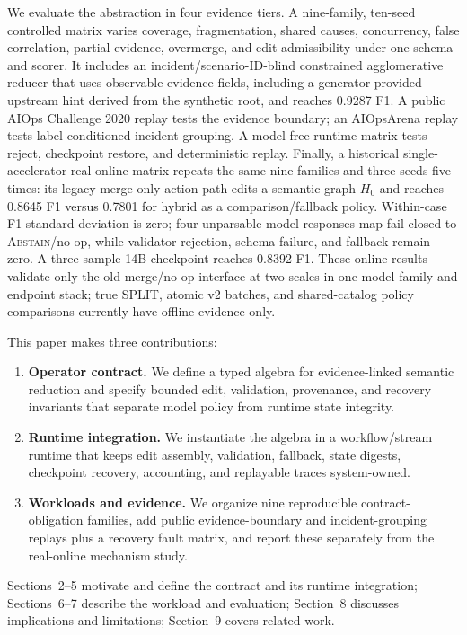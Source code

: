 \documentclass[sigplan,anonymous,nonacm]{acmart}
\begin{document}
We evaluate the abstraction in four evidence tiers. A nine-family, ten-seed controlled matrix varies coverage, fragmentation, shared causes, concurrency, false correlation, partial evidence, overmerge, and edit admissibility under one schema and scorer. It includes an incident/scenario-ID-blind constrained agglomerative reducer that uses observable evidence fields, including a generator-provided upstream hint derived from the synthetic root, and reaches 0.9287 F1. A public AIOps Challenge 2020 replay tests the evidence boundary; an AIOpsArena replay tests label-conditioned incident grouping. A model-free runtime matrix tests reject, checkpoint restore, and deterministic replay. Finally, a historical single-accelerator real-online matrix repeats the same nine families and three seeds five times: its legacy merge-only action path edits a semantic-graph $H_0$ and reaches 0.8645 F1 versus 0.7801 for hybrid as a comparison/fallback policy. Within-case F1 standard deviation is zero; four unparsable model responses map fail-closed to \textsc{Abstain}/no-op, while validator rejection, schema failure, and fallback remain zero. A three-sample 14B checkpoint reaches 0.8392 F1. These online results validate only the old merge/no-op interface at two scales in one model family and endpoint stack; true SPLIT, atomic v2 batches, and shared-catalog policy comparisons currently have offline evidence only.

This paper makes three contributions:

\begin{enumerate}[leftmargin=1.6em]
\item \textbf{Operator contract.} We define a typed algebra for evidence-linked semantic reduction and specify bounded edit, validation, provenance, and recovery invariants that separate model policy from runtime state integrity.
\item \textbf{Runtime integration.} We instantiate the algebra in a workflow/stream runtime that keeps edit assembly, validation, fallback, state digests, checkpoint recovery, accounting, and replayable traces system-owned.
\item \textbf{Workloads and evidence.} We organize nine reproducible contract-obligation families, add public evidence-boundary and incident-grouping replays plus a recovery fault matrix, and report these separately from the real-online mechanism study.
\end{enumerate}

Sections~2--5 motivate and define the contract and its runtime integration; Sections~6--7 describe the workload and evaluation; Section~8 discusses implications and limitations; Section~9 covers related work.
\end{document}

